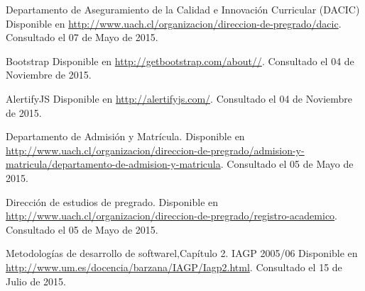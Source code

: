 \begin{spacing}{1.0}
\begin{thebibliography}{99}
\newblock Departamento de Aseguramiento de la Calidad e Innovación Curricular (DACIC)
\newblock Disponible en \url{http://www.uach.cl/organizacion/direccion-de-pregrado/dacic}.
\newblock Consultado el 07 de Mayo de 2015.

\newblock Bootstrap
\newblock Disponible en \url{http://getbootstrap.com/about//}.
\newblock Consultado el 04 de Noviembre de 2015.

\newblock AlertifyJS
\newblock Disponible en \url{http://alertifyjs.com/}.
\newblock Consultado el 04 de Noviembre de 2015.

\newblock Departamento de Admisión y Matrícula.
\newblock Disponible en \url{http://www.uach.cl/organizacion/direccion-de-pregrado/admision-y-matricula/departamento-de-admision-y-matricula}.
\newblock Consultado el 05 de Mayo de 2015.


\newblock Dirección de estudios de pregrado.
\newblock Disponible en \url{http://www.uach.cl/organizacion/direccion-de-pregrado/registro-academico}.
\newblock Consultado el 05 de Mayo de 2015.


\newblock Metodologías de desarrollo de softwarel,Capítulo 2. IAGP 2005/06
\newblock Disponible en \url{http://www.um.es/docencia/barzana/IAGP/Iagp2.html}.
\newblock Consultado el 15 de Julio de 2015.


\end{thebibliography}	
\end{spacing}